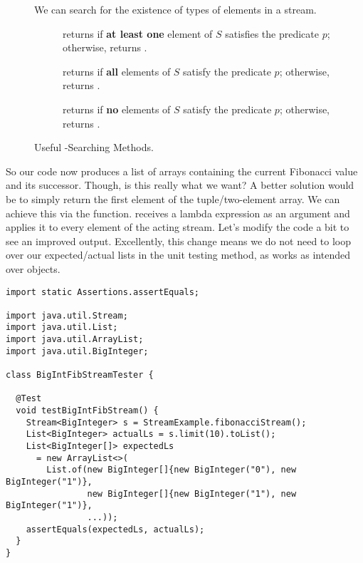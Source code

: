 \begin{figure}[tp]
  \small
  \begin{tcolorbox}[title=Java Stream--Searching Methods]
    We can search for the existence of types of elements in a stream.
    \vspace{2ex}
  \begin{description}
    \item [] returns  if \textbf{at least one} element of $S$ satisfies the predicate $p$; otherwise, returns .
    \item [] returns  if \textbf{all} elements of $S$ satisfy the predicate $p$; otherwise, returns .
    \item [] returns  if \textbf{no} elements of $S$ satisfy the predicate $p$; otherwise, returns .
  \end{description}
\end{tcolorbox}
  \caption{Useful -Searching Methods.}
  \label{fig:streams-searching}
\end{figure}

So our code now produces a list of  arrays containing the current Fibonacci value and its successor. Though, is this really what we want? A better solution would be to simply return the first element of the tuple/two-element array. We can achieve this via the  function.  receives a lambda expression as an argument and applies it to every element of the acting stream. Let's modify the code a bit to see an improved output. Excellently, this change means we do not need to loop over our expected/actual lists in the unit testing method, as  works as intended over  objects.

\begin{cl}[]{}
\begin{lstlisting}[language=MyJava]
import static Assertions.assertEquals;

import java.util.Stream;
import java.util.List;
import java.util.ArrayList;
import java.util.BigInteger;

class BigIntFibStreamTester {

  @Test
  void testBigIntFibStream() {
    Stream<BigInteger> s = StreamExample.fibonacciStream();
    List<BigInteger> actualLs = s.limit(10).toList();
    List<BigInteger[]> expectedLs 
      = new ArrayList<>(
        List.of(new BigInteger[]{new BigInteger("0"), new BigInteger("1")},
                new BigInteger[]{new BigInteger("1"), new BigInteger("1")},
                ...));
    assertEquals(expectedLs, actualLs);
  }
}
\end{lstlisting}
\end{cl}

